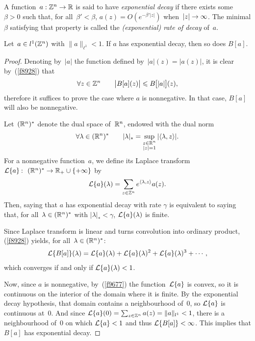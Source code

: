 \begin{Def}\label{def726}
A function~$a:\mathbb{Z}^n\to\mathbb{R}$ is said to have \emph{exponential decay} if there exists some $\beta > 0$
such that, for all~$\beta'<\beta$, $a(z) = O(e^{-\beta'|z|})$ when~$|z|\to\infty$.
The minimal $\beta$ satisfying that property is called the
\emph{(exponential) rate of decay} of~$a$.
\end{Def}

\begin{Lem}\label{l1939a}
Let~$a\in l^1(\mathbb{Z}^n)$ with $\|a\|_{\ell^1} < 1$.
If $a$ has exponential decay, then so does $B[a]$.
\end{Lem}

\begin{proof}
Denoting by~$|a|$ the function defined by~$|a|(z) = |a(z)|$,
it is clear by~(\ref{f8928}) that
\[ \forall z\in\ZZ^n \qquad \big|B[a](z)\big| \leq B\big[|a|\big](z) ,\]
therefore it suffices to prove the case where $a$ is nonnegative.
In that case, $B[a]$ will also be nonnegative.

Let~$(\mathbb{R}^n)^*$ denote the dual space of~$\mathbb{R}^n$, endowed with the dual norm
\[ \forall \lambda \in (\mathbb{R}^n)^* \qquad
|\lambda|_* = \sup_{\substack{z\in\mathbb{R}^n\\|z|=1}} |\langle \lambda, z \rangle| .\]
For a nonnegative function~$a$, we define its Laplace transform
$\mcal{L}\{a\} \colon (\RR^n)^* \to \RR_+ \cup \{+\infty\}$ by
\[\label{f9677} \mathcal{L}\{a\}(\lambda) = \sum_{z\in\mathbb{Z}^n} e^{\langle\lambda,z\rangle} a(z) .\]
Then, saying that $a$ has exponential decay with rate $\gamma$
is equivalent to saying that, for all~$\lambda \in (\mathbb{R}^n)^*$ with $|\lambda|_* < \gamma$,
$\mathcal{L}\{a\}(\lambda)$ is finite.

Since Laplace transform is linear and turns convolution into ordinary product,
(\ref{f8928}) yields, for all~$\lambda \in (\mathbb{R}^n)^*$:
\[\label{f9574} \mathcal{L}\{B[a]\}(\lambda) = \mathcal{L}\{a\}(\lambda) + \mathcal{L}\{a\}(\lambda)^2
+ \mathcal{L}\{a\}(\lambda)^3 + \cdots, \]
which converges if and only if $\mathcal{L}\{a\}(\lambda) < 1$.

Now, since $a$ is nonnegative, by~(\ref{f9677}) the function~$\mathcal{L}\{a\}$ is convex,
so it is continuous on the interior of the domain where it is finite.
By the exponential decay hypothesis, that domain contains a neighbourhood of~$0$,
so $\mathcal{L}\{a\}$ is continuous at~$0$.
And since $\mathcal{L}\{a\}(0) = \sum_{z\in\mathbb{Z}^n} a(z) = \|a\|_{l^1} < 1$,
there is a neighbourhood of~$0$ on which $\mathcal{L}\{a\}<1$ and thus $\mathcal{L}\{B[a]\}<\infty$.
This implies that $B[a]$ has exponential decay.
\end{proof}


